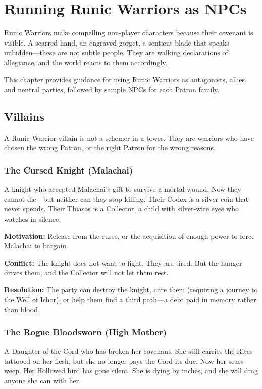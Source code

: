 \section{Running Runic Warriors as NPCs}

Runic Warriors make compelling non-player characters because their covenant is visible. A scarred hand, an engraved gorget, a sentient blade that speaks unbidden—these are not subtle people. They are walking declarations of allegiance, and the world reacts to them accordingly.

This chapter provides guidance for using Runic Warriors as antagonists, allies, and neutral parties, followed by sample NPCs for each Patron family.

\subsection{Villains}

A Runic Warrior villain is not a schemer in a tower. They are warriors who have chosen the wrong Patron, or the right Patron for the wrong reasons.

\subsubsection{The Cursed Knight (Malachai)}

A knight who accepted Malachai's gift to survive a mortal wound. Now they cannot die—but neither can they stop killing. Their Codex is a silver coin that never spends. Their Thiasos is a Collector, a child with silver-wire eyes who watches in silence.

\textbf{Motivation:} Release from the curse, or the acquisition of enough power to force Malachai to bargain.

\textbf{Conflict:} The knight does not want to fight. They are tired. But the hunger drives them, and the Collector will not let them rest.

\textbf{Resolution:} The party can destroy the knight, cure them (requiring a journey to the Well of Ichor), or help them find a third path—a debt paid in memory rather than blood.

\subsubsection{The Rogue Bloodsworn (High Mother)}

A Daughter of the Cord who has broken her covenant. She still carries the Rites tattooed on her flesh, but she no longer pays the Cord its due. Now her scars weep. Her Hollowed bird has gone silent. She is dying by inches, and she will drag anyone she can with her.

